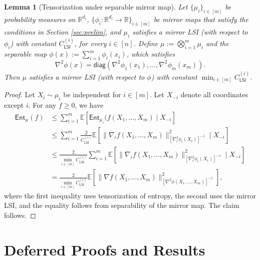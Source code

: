 \documentclass{article}
\newtheorem{lemma}[theorem]{Lemma}
\newcommand{\CLSI}[0]{C_{\mathsf{LSI}}}
\begin{document}
\begin{lemma}[Tensorization under separable mirror map]
    Let $\{\mu_i\}_{i\in[m]}$ be probability measures on $\mathbb{R}^{d_i}$, $\{\phi_i:\mathbb{R}^{d_i}\to \mathbb{R}\}_{i\in[m]}$ be mirror maps that satisfy the conditions in Section \ref{sec:prelim}, and $\mu_i$ satisfies a mirror LSI (with respect to $\phi_i$) with constant $\CLSI^{(i)}$, for every $i \in[n]$. Define $\mu := \bigotimes_{i=1}^m \mu_i$ and the separable map $\phi(x) := \sum_{i=1}^m \phi_i(x_i)$, which satisfies \[
    \nabla^2\phi(x) = \mathsf{diag}(\nabla^2\phi_1(x_1),\dots, \nabla^2\phi_m(x_m)).
    \]
    Then $\mu$ satisfies a mirror LSI (with respect to $\phi$) with constant $\min_{i\in[m]} \CLSI^{(i)}$.
\end{lemma}
\begin{proof}
Let $X_i\sim \mu_i$ be independent for $i\in[m]$. Let $X_{-i}$ denote all coordinates except $i$. For any $f\ge 0$, we have \begin{align*}
        \mathsf{Ent}_\mu(f) &\le \sum_{i=1}^m \mathbb{E}\left[\mathsf{Ent}_{\mu_i}(f(X_1,\dots, X_m)\mid X_{-i}\right]\\
        &\le \sum_{i=1}^m \frac{2}{\CLSI^{(i)}}\mathbb{E}\left[\|\nabla_{i} f(X_1,\dots, X_m)\|_{[\nabla_{i}^2\phi_i(X_i)]^{-1}}^2\mid X_{-i}\right]\\
        &\le \frac{2}{\min_{i\in[m]}\CLSI^{(i)}}\sum_{i= 1}^m\mathbb{E}\left[\|\nabla_{i} f(X_1,\dots, X_m)\|_{[\nabla_{i}^2\phi_i(X_i)]^{-1}}^2\mid X_{-i}\right]\\
        &= \frac{2}{\min_{i\in[m]}\CLSI^{(i)}}\mathbb{E}\left[\|\nabla f(X_1,\dots, X_m)\|^2_{[\nabla^2\phi(X_1,\dots, X_m)]^{-1}}\right],
    \end{align*}
    where the first inequality uses tensorization of entropy, the second uses the mirror LSI, and the equality follows from separability of the mirror map. The claim follows.
\end{proof}


\section{Deferred Proofs and Results}\label{app:proofs}
\end{document}

